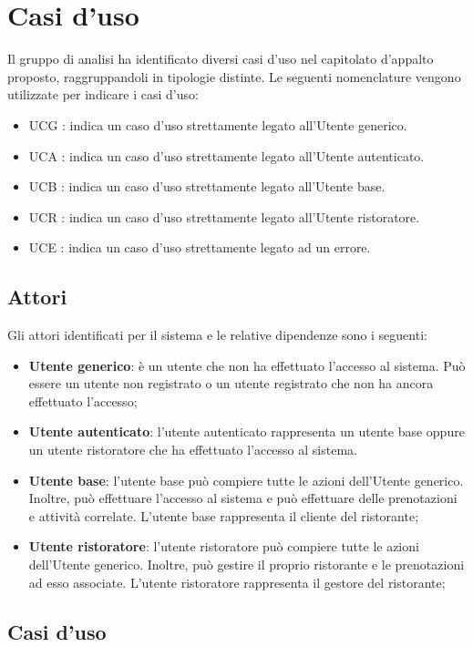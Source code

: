 \section{Casi d'uso}

Il gruppo di analisi ha identificato diversi casi d'uso nel capitolato d'appalto proposto, raggruppandoli in tipologie distinte. 
Le seguenti nomenclature vengono utilizzate per indicare i casi d'uso:

\begin{itemize}
	\item UCG : indica un caso d'uso strettamente legato all'Utente generico.
	\item UCA : indica un caso d'uso strettamente legato all'Utente autenticato.
	\item UCB : indica un caso d'uso strettamente legato all'Utente base.
	\item UCR : indica un caso d'uso strettamente legato all'Utente ristoratore.
	\item UCE : indica un caso d'uso strettamente legato ad un errore.
\end{itemize}

\subsection{Attori}

Gli attori identificati per il sistema e le relative dipendenze sono i seguenti:
\begin{itemize}
	\item \textbf{Utente generico}: è un utente che non ha effettuato l'accesso al
	      sistema. Può essere un utente non registrato o un utente registrato che non ha
	      ancora effettuato l'accesso;

	\item \textbf{Utente autenticato}: l'utente autenticato rappresenta un utente
	      base oppure un utente ristoratore che ha effettuato l'accesso al sistema.

	\item \textbf{Utente base}: l'utente base può compiere tutte le azioni
	      dell'Utente generico. Inoltre, può effettuare l'accesso al sistema e può
	      effettuare delle prenotazioni e attività correlate. L'utente base rappresenta
	      il cliente del ristorante;

	\item \textbf{Utente ristoratore}: l'utente ristoratore può compiere tutte le
	      azioni dell'Utente generico. Inoltre, può gestire il proprio ristorante e le
	      prenotazioni ad esso associate. L'utente ristoratore rappresenta il gestore del
	      ristorante;
\end{itemize}

\subsection{Casi d'uso}